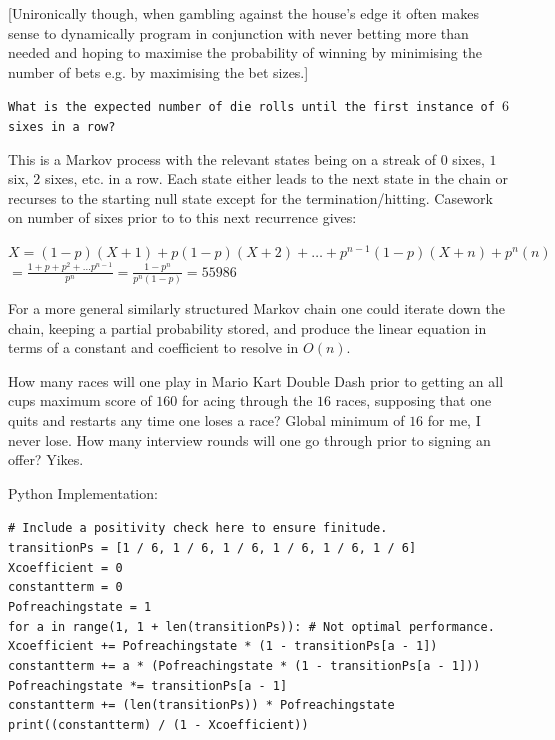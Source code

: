 [Unironically though, when gambling against the house's edge it often makes sense to dynamically program in conjunction with never betting more than needed and hoping to maximise the probability of winning by minimising the number of bets e.g. by maximising the bet sizes.]

\texttt{What is the expected number of die rolls until the first instance of $6$ sixes in a row?}

This is a Markov process with the relevant states being on a streak of $0$ sixes, $1$ six, $2$ sixes, etc. in a row. Each state either leads to the next state in the chain or recurses to the starting null state except for the termination/hitting. Casework on number of sixes prior to to this next recurrence gives:

$X = (1-p)(X+1)+p(1-p)(X+2)+\dots+p^{n-1}(1-p)(X+n)+p^n(n)$ \\
$= \frac{1+p+p^2+\dots p^{n-1}}{p^n} = \frac{1-p^n}{p^n (1-p)} = \boxed{55986}$

For a more general similarly structured Markov chain one could iterate down the chain, keeping a partial probability stored, and produce the linear equation in terms of a constant and coefficient to resolve in $O(n)$.

How many races will one play in Mario Kart Double Dash prior to getting an all cups maximum score of $160$ for acing through the $16$ races, supposing that one quits and restarts any time one loses a race? Global minimum of $16$ for me, I never lose. How many interview rounds will one go through prior to signing an offer? Yikes.

Python Implementation:

\texttt{\# Include a positivity check here to ensure finitude.} \\
\texttt{transitionPs = [1 / 6, 1 / 6, 1 / 6, 1 / 6, 1 / 6, 1 / 6]} \\
\texttt{Xcoefficient = 0} \\
\texttt{constantterm = 0} \\
\texttt{Pofreachingstate = 1} \\
\texttt{for a in range(1, 1 + len(transitionPs)): \# Not optimal performance.} \\
\phantom{xxxx}\texttt{Xcoefficient += Pofreachingstate * (1 - transitionPs[a - 1])} \\
\phantom{xxxx}\texttt{constantterm += a * (Pofreachingstate * (1 - transitionPs[a - 1]))} \\
\phantom{xxxx}\texttt{Pofreachingstate *= transitionPs[a - 1]} \\
\texttt{constantterm += (len(transitionPs)) * Pofreachingstate} \\
\texttt{print((constantterm) / (1 - Xcoefficient))}


